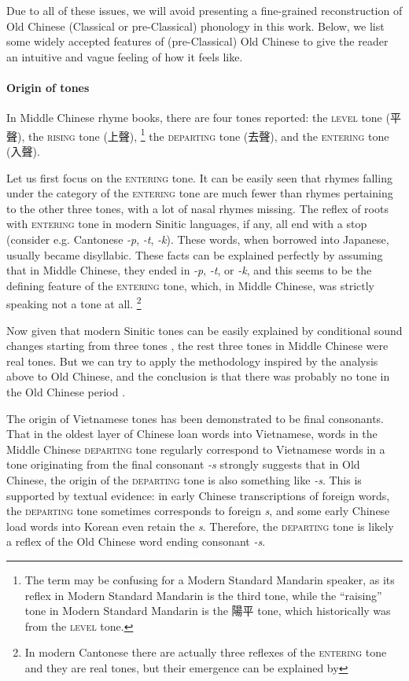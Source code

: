 \documentclass[UTF8, a4paper, oneside, scheme=plain, 12pt]{ctexrep}
\newcommand{\form}[1]{\emph{#1}}
\newcommand*{\category}[1]{\textsc{#1}}
\begin{document}
Due to all of these issues, we will avoid presenting a fine-grained reconstruction of
Old Chinese (Classical or pre-Classical) phonology in this work.
Below, we list some widely accepted features of (pre-Classical) Old Chinese
to give the reader an intuitive and vague feeling of how it feels like.

\paragraph*{Origin of tones}
In Middle Chinese rhyme books, there are four tones reported:
the \category{level} tone (平聲), the \category{rising} tone (上聲),%
\footnote{
    The term may be confusing for a Modern Standard Mandarin speaker,
    as its reflex in Modern Standard Mandarin is the third tone,
    while the ``raising'' tone in Modern Standard Mandarin is the 陽平 tone,
    which historically was from the \category{level} tone.
}
the \category{departing} tone (去聲), and the \category{entering} tone (入聲).

Let us first focus on the \category{entering} tone.
It can be easily seen that rhymes falling under the category of the \category{entering} tone are much fewer than rhymes pertaining to the other three tones,
with a lot of nasal rhymes missing.
The reflex of roots with \category{entering} tone in modern Sinitic languages, if any,
all end with a stop (consider e.g. Cantonese \form{-p}, \form{-t}, \form{-k}).
These words, when borrowed into Japanese, usually became disyllabic.
These facts can be explained perfectly by assuming that in Middle Chinese,
they ended in \form{-p}, \form{-t}, or \form{-k},
and this seems to be the defining feature of the \category{entering} tone,
which, in Middle Chinese, was strictly speaking not a tone at all.%
\footnote{
    In modern Cantonese there are actually three reflexes of the \category{entering} tone
    and they are real tones,
    but their emergence can be explained by 
}

Now given that modern Sinitic tones can be easily explained by 
conditional sound changes starting from three tones \citep{sagart1999origin},
the rest three tones in Middle Chinese were real tones.
But we can try to apply the methodology inspired by the analysis above to Old Chinese,
and the conclusion is that there was probably no tone in the Old Chinese period \citep{sagart1999origin}.

The origin of Vietnamese tones has been demonstrated to be final consonants.
That in the oldest layer of Chinese loan words into Vietnamese,
words in the Middle Chinese \category{departing} tone regularly correspond to Vietnamese words in a tone originating from the final consonant \form{-s}
strongly suggests that in Old Chinese,
the origin of the \category{departing} tone is also something like \form{-s}.
This is supported by textual evidence:
in early Chinese transcriptions of foreign words,
the \category{departing} tone sometimes corresponds to foreign \form{s},
and some early Chinese load words into Korean even retain the \form{s}.
Therefore, the \category{departing} tone is likely a reflex of the Old Chinese word ending consonant \form{-s}.
\end{document}
